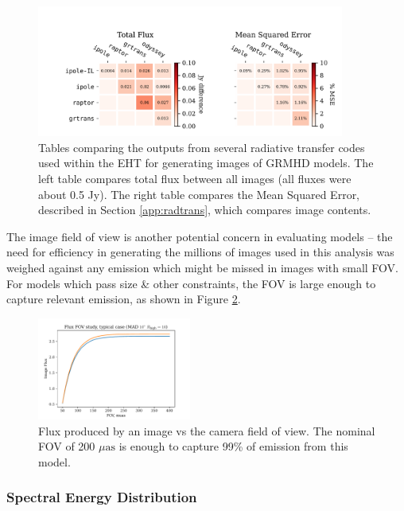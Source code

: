 \begin{figure}
  \centering
  \includegraphics[width=0.9\textwidth]{figures/grmhd_hi_IntegratedUnpolarizeds_plot.pdf}
  \caption{Tables comparing the outputs from several radiative transfer codes used within the EHT for generating images of GRMHD models.  The left table compares total flux between all images (all fluxes were about 0.5 Jy). The right table compares the Mean Squared Error, described in Section \ref{app:radtrans}, which compares image contents.}
  \label{fig:radtrans_grmhd_comp}
\end{figure}

The image field of view is another potential concern in evaluating models -- the need for efficiency in generating the millions of images used in this analysis was weighed against any emission which might be missed in images with small FOV.  For models which pass size \& other constraints, the FOV is large enough to capture relevant emission, as shown in Figure \ref{fig:radtrans_fov_study}.

\begin{figure}
  \centering
  \includegraphics[width=0.45\textwidth]{figures/fov_study.pdf}
  \caption{Flux produced by an image vs the camera field of view.  The nominal FOV of 200 $\mu\mathrm{as}$ is enough to capture 99\% of emission from this model.}
  \label{fig:radtrans_fov_study}
\end{figure}

\subsubsection{Spectral Energy Distribution}

